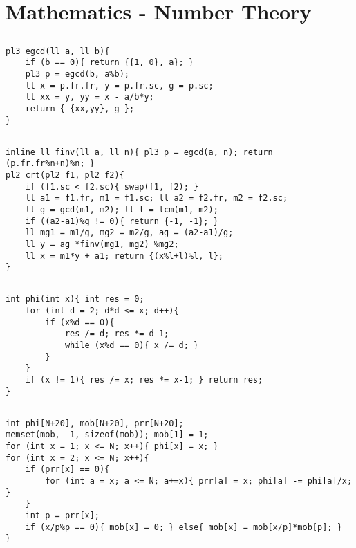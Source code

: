 \documentclass[landscape, 8pt, a4paper, oneside, twocolumn]{extarticle}
\begin{document}
\section{Mathematics - Number Theory}
\subsection{}
\subsection{}
\begin{verbatim}
pl3 egcd(ll a, ll b){
    if (b == 0){ return {{1, 0}, a}; }
    pl3 p = egcd(b, a%b);
    ll x = p.fr.fr, y = p.fr.sc, g = p.sc;
    ll xx = y, yy = x - a/b*y;
    return { {xx,yy}, g };
}
\end{verbatim}
\subsection{}
\begin{verbatim}
inline ll finv(ll a, ll n){ pl3 p = egcd(a, n); return (p.fr.fr%n+n)%n; }
pl2 crt(pl2 f1, pl2 f2){
    if (f1.sc < f2.sc){ swap(f1, f2); }
    ll a1 = f1.fr, m1 = f1.sc; ll a2 = f2.fr, m2 = f2.sc;
    ll g = gcd(m1, m2); ll l = lcm(m1, m2);
    if ((a2-a1)%g != 0){ return {-1, -1}; }
    ll mg1 = m1/g, mg2 = m2/g, ag = (a2-a1)/g;
    ll y = ag *finv(mg1, mg2) %mg2;
    ll x = m1*y + a1; return {(x%l+l)%l, l};
}
\end{verbatim}
\subsection{}
\begin{verbatim}
int phi(int x){ int res = 0;
    for (int d = 2; d*d <= x; d++){
        if (x%d == 0){
            res /= d; res *= d-1;
            while (x%d == 0){ x /= d; }
        }
    }
    if (x != 1){ res /= x; res *= x-1; } return res;
}
\end{verbatim}
\subsection{}
\begin{verbatim}
int phi[N+20], mob[N+20], prr[N+20];
memset(mob, -1, sizeof(mob)); mob[1] = 1;
for (int x = 1; x <= N; x++){ phi[x] = x; }
for (int x = 2; x <= N; x++){
    if (prr[x] == 0){
        for (int a = x; a <= N; a+=x){ prr[a] = x; phi[a] -= phi[a]/x; }
    }
    int p = prr[x];
    if (x/p%p == 0){ mob[x] = 0; } else{ mob[x] = mob[x/p]*mob[p]; }
}
\end{verbatim}
\end{document}

